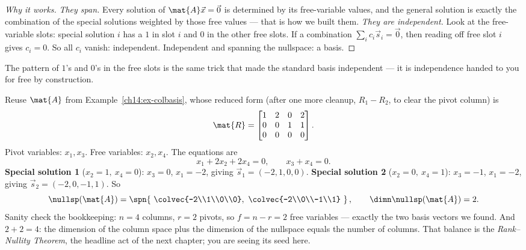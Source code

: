 \begin{proof}[Why it works]
\emph{They span.} Every solution of $\mat{A}\vec{x}=\vec{0}$ is determined by its
free-variable values, and the general solution is exactly the combination of the
special solutions weighted by those free values --- that is how we built them.
\emph{They are independent.} Look at the free-variable slots: special solution $i$
has a $1$ in slot $i$ and $0$ in the other free slots. If a combination
$\sum_i c_i\vec{s}_i = \vec{0}$, then reading off free slot $i$ gives $c_i = 0$.
So all $c_i$ vanish: independent. Independent and spanning the nullspace: a basis.
\end{proof}

The pattern of $1$'s and $0$'s in the free slots is the same trick that made the
standard basis independent --- it is independence handed to you for free by
construction.

\begin{example}
\label{ch14:ex-nullbasis}
Reuse $\mat{A}$ from Example~\ref{ch14:ex-colbasis}, whose reduced form (after one
more cleanup, $R_1 - R_2$, to clear the pivot column) is
\[
  \mat{R}=\begin{bmatrix} 1 & 2 & 0 & 2\\ 0 & 0 & 1 & 1\\ 0 & 0 & 0 & 0\end{bmatrix}.
\]
Pivot variables: $x_1, x_3$. Free variables: $x_2, x_4$. The equations are
\[
  x_1 + 2x_2 + 2x_4 = 0,\qquad x_3 + x_4 = 0.
\]
\textbf{Special solution 1} ($x_2=1,\ x_4=0$): $x_3 = 0$, $x_1 = -2$, giving
$\vec{s}_1 = (-2,1,0,0)$.
\textbf{Special solution 2} ($x_2=0,\ x_4=1$): $x_3 = -1$, $x_1 = -2$, giving
$\vec{s}_2 = (-2,0,-1,1)$. So
\[
  \nullsp(\mat{A}) = \spn\!\left\{\ \colvec{-2\\1\\0\\0},\ \colvec{-2\\0\\-1\\1}\ \right\},
  \qquad \dimn\nullsp(\mat{A}) = 2.
\]
Sanity check the bookkeeping: $n = 4$ columns, $r = 2$ pivots, so $f = n - r = 2$
free variables --- exactly the two basis vectors we found. And $2 + 2 = 4$: the
dimension of the column space plus the dimension of the nullspace equals the
number of columns. That balance is the \emph{Rank--Nullity Theorem}, the headline
act of the next chapter; you are seeing its seed here.
\end{example}

